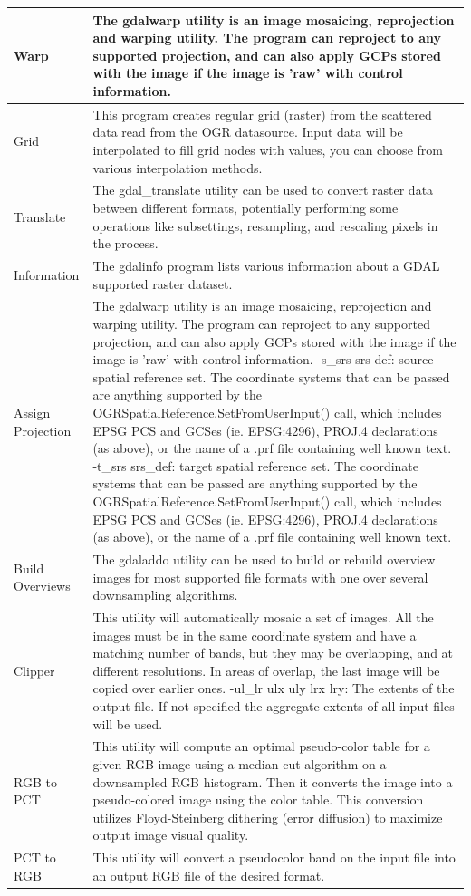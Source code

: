 {\begin{longtable}{|p{3cm}|p{13cm}|}
\hline Warp & The gdalwarp utility is an image mosaicing, reprojection and warping utility. The program can reproject to any supported projection, and can also apply GCPs stored with the image if the image is 'raw' with control information. \\
\hline Grid & This program creates regular grid (raster) from the scattered data read from the OGR datasource. Input data will be interpolated to fill grid nodes with values, you can choose from various interpolation methods.\\
\hline Translate & The gdal\_translate utility can be used to convert raster data between different formats, potentially performing some operations like subsettings, resampling, and rescaling pixels in the process.\\
\hline Information & The gdalinfo program lists various information about a GDAL supported raster dataset. \\
\hline Assign Projection &  The gdalwarp utility is an image mosaicing, reprojection and warping utility. The program can reproject to any supported projection, and can also apply GCPs stored with the image if the image is 'raw' with control information.
-s\_srs srs def:
source spatial reference set. The coordinate systems that can be passed are anything supported by the OGRSpatialReference.SetFromUserInput() call, which includes EPSG PCS and GCSes (ie. EPSG:4296), PROJ.4 declarations (as above), or the name of a .prf file containing well known text. 
-t\_srs srs\_def:
target spatial reference set. The coordinate systems that can be passed are anything supported by the OGRSpatialReference.SetFromUserInput() call, which includes EPSG PCS and GCSes (ie. EPSG:4296), PROJ.4 declarations (as above), or the name of a .prf file containing well known text. \\
\hline Build Overviews &  The gdaladdo utility can be used to build or rebuild overview images for most supported file formats with one over several downsampling algorithms.\\
\hline Clipper & This utility will automatically mosaic a set of images. All the images must be in the same coordinate system and have a matching number of bands, but they may be overlapping, and at different resolutions. In areas of overlap, the last image will be copied over earlier ones. 
-ul\_lr ulx uly lrx lry:
The extents of the output file. If not specified the aggregate extents of all input files will be used. \\
\hline RGB to PCT &  This utility will compute an optimal pseudo-color table for a given RGB image using a median cut algorithm on a downsampled RGB histogram. Then it converts the image into a pseudo-colored image using the color table. This conversion utilizes Floyd-Steinberg dithering (error diffusion) to maximize output image visual quality. \\
\hline PCT to RGB &  This utility will convert a pseudocolor band on the input file into an output RGB file of the desired format.\\
\hline
\end{longtable}

}
